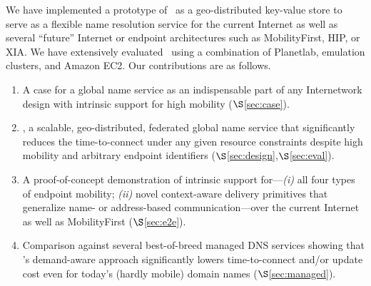 


We have implemented a prototype of \auspice\ as a geo-distributed key-value store to serve as a flexible name resolution service for the current Internet as well as several ``future'' Internet or endpoint architectures such as MobilityFirst\cite{MobilityFirst}, HIP\cite{HIP}, or XIA\cite{XIA}. We have extensively evaluated \auspice\  using a combination of Planetlab, emulation clusters, and Amazon EC2.  Our contributions are as follows.
\begin{enumerate}
\item A case for a global name service as an indispensable part of any Internetwork design with intrinsic support for high mobility ($\S$\ref{sec:case}).
\vsp
\item \auspice, a scalable, geo-distributed, federated global name service that significantly reduces the time-to-connect under any given resource constraints despite high mobility and arbitrary endpoint identifiers ($\S$\ref{sec:design},$\S$\ref{sec:eval}). 
\figvsp
\item A proof-of-concept demonstration of intrinsic support for---{\em(i)} all four types of endpoint mobility; {\em(ii)} novel context-aware delivery primitives that generalize name- or address-based communication---over the current Internet as well as MobilityFirst \cite{MobilityFirst} ($\S$\ref{sec:e2e}). 
\vsp
\item Comparison against several best-of-breed managed DNS services showing that \auspice's  demand-aware approach significantly lowers time-to-connect and/or update cost even for today's (hardly mobile) domain names ($\S$\ref{sec:managed}).
\vsp
\end{enumerate}
\vsp

